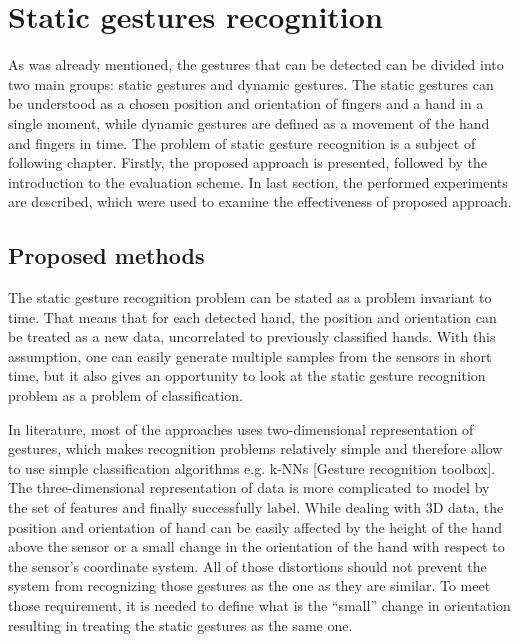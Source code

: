 
\chapter{Static gestures recognition}

As was already mentioned, the gestures that can be detected can be divided into two main groups: static gestures and dynamic gestures.
The static gestures can be understood as a chosen position and orientation of fingers and a hand in a single moment, while dynamic gestures are defined as a movement of the hand and fingers in time. 
The problem of static gesture recognition is a subject of following chapter. 
Firstly, the proposed approach is presented, followed by the introduction to the evaluation scheme. 
In last section, the performed experiments are described, which were used to examine the effectiveness of proposed approach.

\section{Proposed methods}

The static gesture recognition problem can be stated as a problem invariant to time.
That means that for each detected hand, the position and orientation can be treated as a new data, uncorrelated to previously classified hands.
With this assumption, one can easily generate multiple samples from the sensors in short time, but it also gives an opportunity to look at the static gesture recognition problem as a problem of classification.

In literature, most of the approaches uses two-dimensional representation of gestures, which makes recognition problems relatively simple and therefore allow to use simple classification algorithms e.g. k-NNs [Gesture recognition toolbox]. 
The three-dimensional representation of data is more complicated to model by the set of features and finally successfully label.
While dealing with 3D data, the position and orientation of hand can be easily affected by the height of the hand above the sensor or a small change in the orientation of the hand with respect to the sensor's coordinate system. 
All of those distortions should not prevent the system from recognizing those gestures as the one as they are similar.
To meet those requirement, it is needed to define what is the ``small'' change in orientation resulting in treating the static gestures as the same one.

